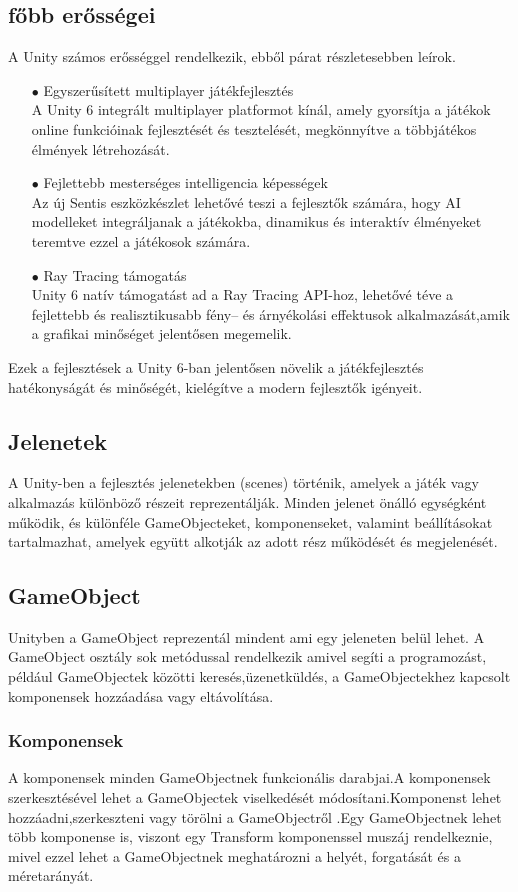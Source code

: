 \documentclass[
]{thesis-ekf}
\theoremstyle{definition}
\theoremstyle{remark}
\begin{document}
\subsection{főbb erősségei}
A Unity számos erősséggel rendelkezik, ebből párat részletesebben leírok.
\begin{itemize}
	\item[$\bullet$]Egyszerűsített multiplayer játékfejlesztés \\  A Unity 6 integrált multiplayer platformot kínál, amely gyorsítja a játékok online funkcióinak fejlesztését és tesztelését, megkönnyítve a többjátékos élmények létrehozását. 
	\item[$\bullet$]Fejlettebb mesterséges intelligencia képességek \\Az új Sentis eszközkészlet lehetővé teszi a fejlesztők számára, hogy AI modelleket integráljanak a játékokba, dinamikus és interaktív élményeket teremtve ezzel a játékosok számára. 
	\item[$\bullet$]Ray Tracing támogatás \\  Unity 6 natív támogatást ad a Ray Tracing API-hoz, lehetővé téve a fejlettebb és realisztikusabb fény-- és árnyékolási effektusok alkalmazását,amik a grafikai minőséget jelentősen megemelik.
\end{itemize}
Ezek a fejlesztések a Unity 6-ban jelentősen növelik a játékfejlesztés hatékonyságát és minőségét, kielégítve a modern fejlesztők igényeit.


\subsection{Jelenetek}
A Unity-ben a fejlesztés jelenetekben (scenes) történik, amelyek a játék vagy alkalmazás különböző részeit reprezentálják. Minden jelenet önálló egységként működik, és különféle GameObjecteket, komponenseket, valamint beállításokat tartalmazhat, amelyek együtt alkotják az adott rész működését és megjelenését.
\subsection{GameObject}
Unityben a GameObject reprezentál mindent ami egy jeleneten belül lehet. A GameObject osztály sok metódussal rendelkezik amivel segíti a programozást, például GameObjectek közötti keresés,üzenetküldés, a GameObjectekhez kapcsolt komponensek hozzáadása vagy eltávolítása.

\subsubsection{Komponensek}
A komponensek minden GameObjectnek funkcionális darabjai.A komponensek szerkesztésével lehet a GameObjectek viselkedését módosítani.Komponenst lehet hozzáadni,szerkeszteni vagy törölni a GameObjectről .Egy GameObjectnek lehet több komponense is, viszont egy Transform komponenssel muszáj rendelkeznie, mivel ezzel lehet a GameObjectnek meghatározni a helyét, forgatását és a méretarányát.
\end{document}
